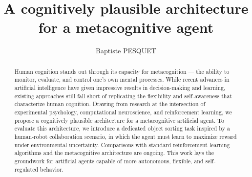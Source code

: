 \documentclass[10pt, a4paper]{collection-edmi}
\begin{document}

\title{A cognitively plausible architecture for a metacognitive agent}
\author{Baptiste PESQUET}

\institution{\labriinria}
\maketitle

\begin{abstract}
Human cognition stands out through its capacity for metacognition — the ability to monitor, evaluate, and control one's own mental processes. While recent advances in artificial intelligence have given impressive results in decision-making and learning, existing approaches still fall short of replicating the flexibility and self-awareness that characterize human cognition. Drawing from research at the intersection of experimental psychology, computational neuroscience, and reinforcement learning, we propose a cognitively plausible architecture for a metacognitive artificial agent. To evaluate this architecture, we introduce a dedicated object sorting task inspired by a human-robot collaboration scenario, in which the agent must learn to maximize reward under environmental uncertainty. Comparisons with standard reinforcement learning algorithms and the metacognitive architecture are ongoing. This work lays the groundwork for artificial agents capable of more autonomous, flexible, and self-regulated behavior.
\end{abstract}
\end{document}
